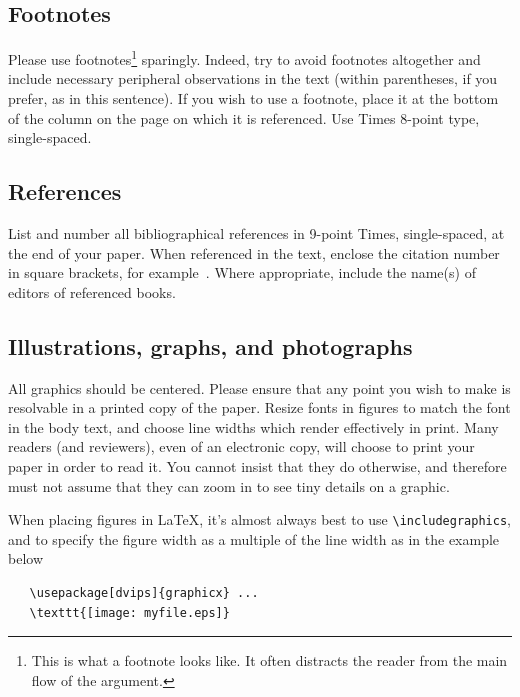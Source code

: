 \documentclass[10pt,twocolumn,letterpaper]{article}
\begin{document}
\subsection{Footnotes}

Please use footnotes\footnote {This is what a footnote looks like.  It
often distracts the reader from the main flow of the argument.} sparingly.
Indeed, try to avoid footnotes altogether and include necessary peripheral
observations in
the text (within parentheses, if you prefer, as in this sentence).  If you
wish to use a footnote, place it at the bottom of the column on the page on
which it is referenced. Use Times 8-point type, single-spaced.


\subsection{References}

List and number all bibliographical references in 9-point Times,
single-spaced, at the end of your paper. When referenced in the text,
enclose the citation number in square brackets, for
example~\cite{Authors14}.  Where appropriate, include the name(s) of
editors of referenced books.


\subsection{Illustrations, graphs, and photographs}

All graphics should be centered.  Please ensure that any point you wish to
make is resolvable in a printed copy of the paper.  Resize fonts in figures
to match the font in the body text, and choose line widths which render
effectively in print.  Many readers (and reviewers), even of an electronic
copy, will choose to print your paper in order to read it.  You cannot
insist that they do otherwise, and therefore must not assume that they can
zoom in to see tiny details on a graphic.

When placing figures in \LaTeX, it's almost always best to use
\verb+\includegraphics+, and to specify the  figure width as a multiple of
the line width as in the example below
{\small\begin{verbatim}
   \usepackage[dvips]{graphicx} ...
   \texttt{[image: myfile.eps]}
\end{verbatim}
}





{\small


}
\end{document}
